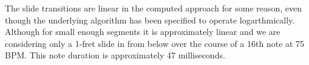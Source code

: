 \documentclass[../main.tex]{subfiles}
\begin{document}
The slide transitions are linear in the computed approach for some reason, even though the underlying algorithm has been specified to operate logarthmically. Although for small enough segments it is approximately linear and we are considering only a 1-fret slide in
from below over the course of a 16th note at 75 BPM. This note duration is approximately 47 milliseconds.
\end{document}
